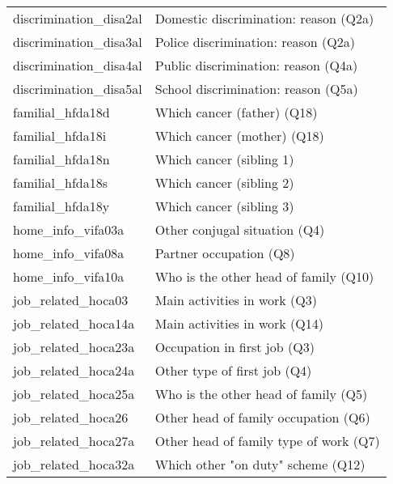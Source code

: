 \begin{table}[h]
\begin{center}
\begin{tabular}{l|l}
            discrimination\_disa2al          & Domestic discrimination: reason (Q2a)     \\
            discrimination\_disa3al          & Police discrimination: reason (Q2a)       \\
            discrimination\_disa4al          & Public discrimination: reason (Q4a)       \\
            discrimination\_disa5al          & School discrimination: reason (Q5a)       \\
            familial\_hfda18d                & Which cancer (father) (Q18)               \\
            familial\_hfda18i                & Which cancer (mother) (Q18)               \\
            familial\_hfda18n                & Which cancer (sibling 1)                  \\
            familial\_hfda18s                & Which cancer (sibling 2)                  \\
            familial\_hfda18y                & Which cancer (sibling 3)                  \\
            home\_info\_vifa03a              & Other conjugal situation (Q4)             \\
            home\_info\_vifa08a              & Partner occupation (Q8)                   \\
            home\_info\_vifa10a              & Who is the other head of family (Q10)     \\
            job\_related\_hoca03             & Main activities in work (Q3)              \\
            job\_related\_hoca14a            & Main activities in work (Q14)             \\
            job\_related\_hoca23a            & Occupation in first job (Q3)              \\
            job\_related\_hoca24a            & Other type of first job (Q4)              \\
            job\_related\_hoca25a            & Who is the other head of family (Q5)      \\
            job\_related\_hoca26             & Other head of family occupation (Q6)      \\
            job\_related\_hoca27a            & Other head of family type of work (Q7)    \\
            job\_related\_hoca32a            & Which other "on duty" scheme (Q12)        \\

\end{tabular}
\end{center}
\end{table}
